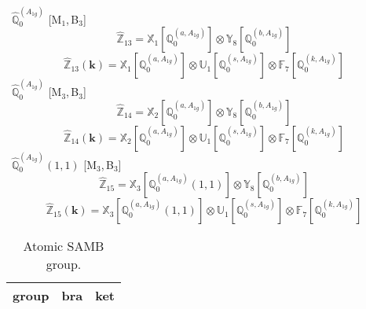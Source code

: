 \documentclass[fleqn,10pt,landscape]{article}
\begin{document}
\begin{itemize}
\begin{dmath*}
\end{dmath*}
\vspace{4mm}
\noindent {} $\,\,\,\hat{\mathbb{Q}}_{0}^{(A_{1g})}$ [M$_{1}$,\,B$_{3}$]
\begin{dmath*}
\hat{\mathbb{Z}}_{13}=\mathbb{X}_{1}[\mathbb{Q}_{0}^{(a,A_{1g})}] \otimes\mathbb{Y}_{8}[\mathbb{Q}_{0}^{(b,A_{1g})}]
\end{dmath*}
\begin{dmath*}
\hat{\mathbb{Z}}_{13}(\bm{k})=\mathbb{X}_{1}[\mathbb{Q}_{0}^{(a,A_{1g})}] \otimes\mathbb{U}_{1}[\mathbb{Q}_{0}^{(s,A_{1g})}] \otimes\mathbb{F}_{7}[\mathbb{Q}_{0}^{(k,A_{1g})}]
\end{dmath*}
\vspace{4mm}
\noindent {} $\,\,\,\hat{\mathbb{Q}}_{0}^{(A_{1g})}$ [M$_{3}$,\,B$_{3}$]
\begin{dmath*}
\hat{\mathbb{Z}}_{14}=\mathbb{X}_{2}[\mathbb{Q}_{0}^{(a,A_{1g})}] \otimes\mathbb{Y}_{8}[\mathbb{Q}_{0}^{(b,A_{1g})}]
\end{dmath*}
\begin{dmath*}
\hat{\mathbb{Z}}_{14}(\bm{k})=\mathbb{X}_{2}[\mathbb{Q}_{0}^{(a,A_{1g})}] \otimes\mathbb{U}_{1}[\mathbb{Q}_{0}^{(s,A_{1g})}] \otimes\mathbb{F}_{7}[\mathbb{Q}_{0}^{(k,A_{1g})}]
\end{dmath*}
\vspace{4mm}
\noindent {} $\,\,\,\hat{\mathbb{Q}}_{0}^{(A_{1g})}(1,1)$ [M$_{3}$,\,B$_{3}$]
\begin{dmath*}
\hat{\mathbb{Z}}_{15}=\mathbb{X}_{3}[\mathbb{Q}_{0}^{(a,A_{1g})}(1,1)] \otimes\mathbb{Y}_{8}[\mathbb{Q}_{0}^{(b,A_{1g})}]
\end{dmath*}
\begin{dmath*}
\hat{\mathbb{Z}}_{15}(\bm{k})=\mathbb{X}_{3}[\mathbb{Q}_{0}^{(a,A_{1g})}(1,1)] \otimes\mathbb{U}_{1}[\mathbb{Q}_{0}^{(s,A_{1g})}] \otimes\mathbb{F}_{7}[\mathbb{Q}_{0}^{(k,A_{1g})}]
\end{dmath*}
\begin{center}
\renewcommand{\arraystretch}{1.3}
\begin{longtable}{c|c|c}
\caption{Atomic SAMB group.}
 \\
 \hline \hline
group & bra & ket \\ \hline \endfirsthead


\end{longtable}
\end{center}
\end{itemize}
\end{document}
